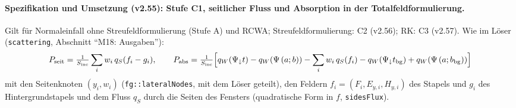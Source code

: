 \paragraph{Spezifikation und Umsetzung (v2.55): Stufe C1, seitlicher Fluss und Absorption in der Totalfeldformulierung.}
Gilt für Normaleinfall ohne Streufeldformulierung (Stufe A) und RCWA; Streufeldformulierung: C2 (v2.56); RK: C3 (v2.57).
Wie im Löser (\verb|scattering|, Abschnitt \enquote{M18: Ausgaben}):
\[
P_{\text{seit}}=\tfrac1{S_{\text{inc}}}\sum_i w_i\,q_S(f_i-g_i),\qquad
P_{\text{abs}}=\tfrac1{S_{\text{inc}}}\Bigl[q_W(\Psi_\downarrow t)-q_W(\Psi\,(a;b))-\sum_i w_i\,q_S(f_i)
-q_W(\Psi_\downarrow t_{\text{bg}})+q_W(\Psi\,(a;b_{\text{bg}}))\Bigr]
\]
mit den Seitenknoten $(y_i,w_i)$ (\verb|fg::lateralNodes|, mit dem Löser geteilt), den Feldern
$f_i=(F_i,E_{y,i},H_{y,i})$ des Stapels und $g_i$ des Hintergrundstapels und dem Fluss $q_S$ durch die Seiten des
Fensters (quadratische Form in $f$, \verb|sidesFlux|).
